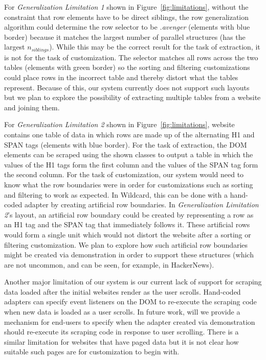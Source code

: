 \documentclass[sigconf,10pt]{acmart}
\begin{document}
For \emph{Generalization Limitation 1} shown in
Figure~\ref{fig:limitations}, without the constraint that row elements
have to be direct siblings, the row generalization algorithm could
determine the row selector to be \emph{.avenger} (elements with blue
border) because it matches the largest number of parallel structures
(has the largest \(n_{siblings}\)). While this may be the correct result
for the task of extraction, it is not for the task of customization. The
selector matches all rows across the two tables (elements with green
border) so the sorting and filtering customizations could place rows in
the incorrect table and thereby distort what the tables represent.
Because of this, our system currently does not support such layouts but
we plan to explore the possibility of extracting multiple tables from a
website and joining them.

For \emph{Generalization Limitation 2} shown in
Figure~\ref{fig:limitations}, website contains one table of data in
which rows are made up of the alternating H1 and SPAN tags (elements
with blue border). For the task of extraction, the DOM elements can be
scraped using the shown classes to output a table in which the values of
the H1 tags form the first column and the values of the SPAN tag form
the second column. For the task of customization, our system would need
to know what the row boundaries were in order for customizations such as
sorting and filtering to work as expected. In Wildcard, this can be done
with a hand-coded adapter by creating artificial row boundaries. In
\emph{Generalization Limitation 2}'s layout, an artificial row boundary
could be created by representing a row as an H1 tag and the SPAN tag
that immediately follows it. These artificial rows would form a single
unit which would not distort the website after a sorting or filtering
customization. We plan to explore how such artificial row boundaries
might be created via demonstration in order to support these structures
(which are not uncommon, and can be seen, for example, in HackerNews).

Another major limitation of our system is our current lack of support
for scraping data loaded after the initial websites render as the user
scrolls. Hand-coded adapters can specify event listeners on the DOM to
re-execute the scraping code when new data is loaded as a user scrolls.
In future work, will we provide a mechanism for end-users to specify
when the adapter created via demonstration should re-execute its
scraping code in response to user scrolling. There is a similar
limitation for websites that have paged data but it is not clear how
suitable such pages are for customization to begin with.
\end{document}

